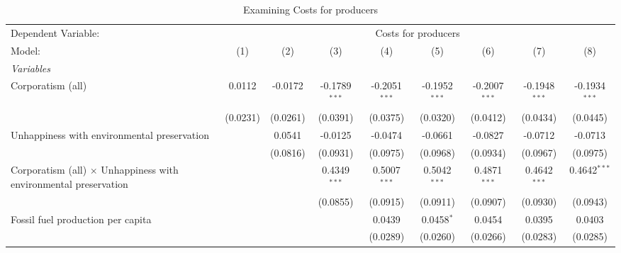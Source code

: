 
\begin{table}[htbp]
   \caption{Examining Costs for producers}
   \centering
   \begin{tabular}{lcccccccc}
      \tabularnewline \midrule \midrule
      Dependent Variable: & \multicolumn{8}{c}{Costs for producers}\\
      Model:                                                                  & (1)      & (2)      & (3)             & (4)             & (5)             & (6)             & (7)             & (8)\\  
      \midrule
      \emph{Variables}\\
      Corporatism (all)                                                       & 0.0112   & -0.0172  & -0.1789$^{***}$ & -0.2051$^{***}$ & -0.1952$^{***}$ & -0.2007$^{***}$ & -0.1948$^{***}$ & -0.1934$^{***}$\\   
                                                                              & (0.0231) & (0.0261) & (0.0391)        & (0.0375)        & (0.0320)        & (0.0412)        & (0.0434)        & (0.0445)\\   
      Unhappiness with environmental preservation                             &          & 0.0541   & -0.0125         & -0.0474         & -0.0661         & -0.0827         & -0.0712         & -0.0713\\   
                                                                              &          & (0.0816) & (0.0931)        & (0.0975)        & (0.0968)        & (0.0934)        & (0.0967)        & (0.0975)\\   
      Corporatism (all) $\times$ Unhappiness with environmental preservation  &          &          & 0.4349$^{***}$  & 0.5007$^{***}$  & 0.5042$^{***}$  & 0.4871$^{***}$  & 0.4642$^{***}$  & 0.4642$^{***}$\\   
                                                                              &          &          & (0.0855)        & (0.0915)        & (0.0911)        & (0.0907)        & (0.0930)        & (0.0943)\\   
      Fossil fuel production per capita                                       &          &          &                 & 0.0439          & 0.0458$^{*}$    & 0.0454          & 0.0395          & 0.0403\\   
                                                                              &          &          &                 & (0.0289)        & (0.0260)        & (0.0266)        & (0.0283)        & (0.0285)\\   

\end{tabular}
\end{table}

